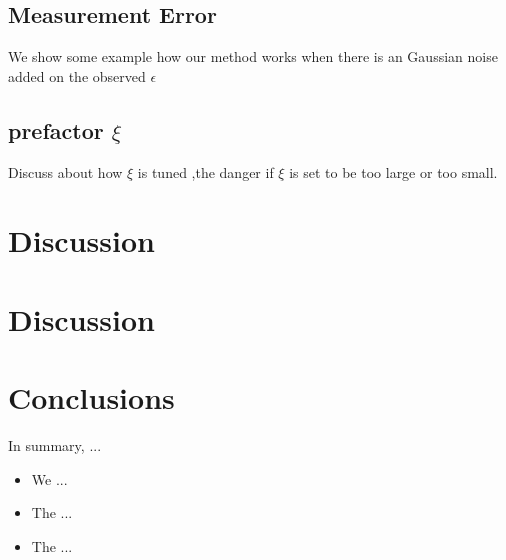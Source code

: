 \documentclass[useAMS,usenatbib]{mn2e}
\begin{document}
\subsection{Measurement Error}
We show some example how our method works when there is an Gaussian noise added on the observed $\epsilon$

\subsection{prefactor $\xi$}
Discuss about how $\xi$ is tuned ,the danger if $\xi$ is set to be too large or too small. 






\section{Discussion}
\label{sec:XXX}



\section{Discussion}
\label{sec:discuss}



\section{Conclusions}
\label{sec:conclusions}

In summary, ...

\begin{itemize}

\item We ...

\item The ...

\item The ...

\end{itemize}
\end{document}
